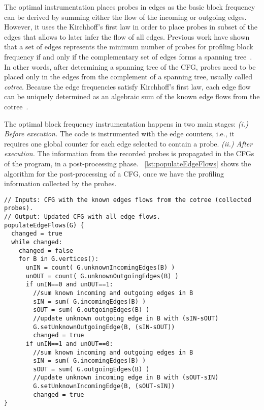 The optimal instrumentation places probes in edges as the basic block frequency can be derived by summing either the flow of the incoming or outgoing edges.
However, it uses the Kirchhoff's first law in order to place probes in subset of the edges that allows to later infer the flow of all edges.
Previous work have shown that a set of edges represents the minimum number of probes for profiling block frequency if and only if the complementary set of edges forms a spanning tree~\citep{nahapetian73,ball94}.
In other words, after determining a spanning tree of the CFG, probes need to be placed only in the edges from the complement of a spanning tree, usually called \textit{cotree}.
Because the edge frequencies satisfy Kirchhoff's first law, each edge flow can be uniquely determined as an algebraic sum of the known edge flows from the cotree~\citep{nahapetian73,ball94}.

The optimal block frequency instrumentation happens in two main stages:
\textit{(i.) Before execution.} The code is instrumented with the edge counters, i.e., it requires one global counter for each edge selected to contain a probe.
\textit{(ii.) After execution.} The information from the recorded probes is propagated in the CFGs of the program, in a post-processing phase.
\lstlistingname~\ref{lst:populateEdgeFlows} shows the algorithm for the post-processing of a CFG, once we have the profiling information collected by the probes.

\begin{lstlisting}[caption={Post-processing of the CFG for populating all edge flows based on the collected probes.}, label={lst:populateEdgeFlows}, float]
// Inputs: CFG with the known edges flows from the cotree (collected probes).
// Output: Updated CFG with all edge flows.
populateEdgeFlows(G) {
  changed = true
  while changed:
    changed = false
    for B in G.vertices():
      unIN = count( G.unknownIncomingEdges(B) )
      unOUT = count( G.unknownOutgoingEdges(B) )
      if unIN==0 and unOUT==1:
        //sum known incoming and outgoing edges in B
        sIN = sum( G.incomingEdges(B) )
        sOUT = sum( G.outgoingEdges(B) )
        //update unknown outgoing edge in B with (sIN-sOUT)
        G.setUnknownOutgoingEdge(B, (sIN-sOUT))
        changed = true
      if unIN==1 and unOUT==0:
        //sum known incoming and outgoing edges in B
        sIN = sum( G.incomingEdges(B) )
        sOUT = sum( G.outgoingEdges(B) )
        //update unknown incoming edge in B with (sOUT-sIN)
        G.setUnknownIncomingEdge(B, (sOUT-sIN))
        changed = true
}
\end{lstlisting}

